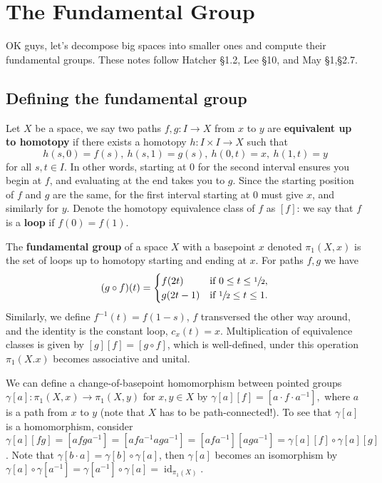 \section{The Fundamental Group}
OK guys, let's decompose big spaces into smaller ones and compute their fundamental groups. These notes follow Hatcher \S 1.2, Lee \S 10, and May \S 1,\S 2.7.
\subsection{Defining the fundamental group}
Let $X$ be a space, we say two paths $f,g \colon I \to X$ from $x$ to $y$ are \textbf{equivalent up to homotopy} if there exists a homotopy $h\colon I\times I \to X     $ such that 
\[
    h(s,0)=f(s),\ h(s,1)=g(s),\ h(0,t)=x,\ h(1,t)=y
\] for all $s,t\in I$. In other words, starting at $0$ for the second interval ensures you begin at $f$, and evaluating at the end takes you to $g$. Since the starting position of $f$ and $g$ are the same, for the first interval starting at $0$ must give $x$, and similarly for $y$. Denote the homotopy equivalence class of $f$ as $[f]$: we say that $f$ is a \textbf{loop} if $f(0)=f(1)$.
\begin{definition}
    The \textbf{fundamental group} of a space $X$ with a basepoint $x$ denoted $\pi_1(X,x)$ is the set of loops up to homotopy starting and ending at $x$. For paths $f,g$ we have \[
        (g\circ f)(t)=
        \begin{cases}
            f(2t)\quad & \text{if} \ 0\leq t \leq \sfrac{1}{2},\\
            g(2t-1) &\text{if} \ \sfrac{1}{2} \leq t \leq 1.
        \end{cases}
    \] Similarly, we define $f^{-1}(t)=f(1-s)$, $f$ transversed the other way around, and the identity is the constant loop, $c_x(t)=x$. Multiplication of equivalence classes is given by $[g][f]=[g\circ f]$, which is well-defined, under this operation $\pi_1(X.x)$ becomes associative and unital.
\end{definition}
We can define a change-of-basepoint homomorphism between pointed groups $\gamma[a] \colon \pi_1(X,x)\to \pi_1(X,y)$ for $x,y\in X$ by $\gamma[a][f]=[a\cdot f\cdot a^{-1}],$ where $a$ is a path from $x$ to $y$ (note that $X$ has to be path-connected!). To see that $\gamma[a]$ is a homomorphism, consider $\gamma[a][fg]=[afga^{-1}]=[afa^{-1}aga^{-1}]=[afa^{-1}][aga^{-1}]=\gamma[a][f]\circ \gamma[a][g]$. Note that $\gamma[b\cdot a]=\gamma[b]\circ \gamma[a]$, then $\gamma[a]$ becomes an isomorphism by $\gamma[a]\circ \gamma[a^{-1}]=\gamma[a^{-1}]\circ \gamma[a]=\operatorname{id}_{\pi_1(X)} .$

